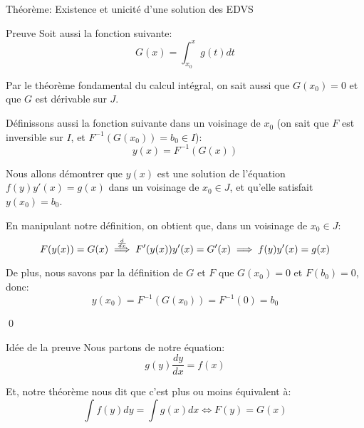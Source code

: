 \documentclass[a4paper]{article}
\begin{document}
\begin{parag}{Théorème: Existence et unicité d'une solution des EDVS}
\begin{subparag}{Preuve}
        Soit aussi la fonction suivante: 
        \[G\left(x\right) = \int_{x_0}^{x} g\left(t\right)dt\]
        
        Par le théorème fondamental du calcul intégral, on sait aussi que $G\left(x_0\right) = 0$ et que $G$ est dérivable sur $J$.

        Définissons aussi la fonction suivante dans un voisinage de $x_0$ (on sait que $F$ est inversible sur $I$, et $F^{-1}\left(G\left(x_0\right)\right) = b_0 \in I$): 
        \[y\left(x\right) = F^{-1}\left(G\left(x\right)\right)\]
        
        Nous allons démontrer que $y\left(x\right)$ est une solution de l'équation $f\left(y\right) y'\left(x\right) = g\left(x\right)$ dans un voisinage de $x_0 \in J$, et qu'elle satisfait $y\left(x_0\right) = b_0$.

        En manipulant notre définition, on obtient que, dans un voisinage de $x_0 \in J$: 
        \[F\left(y\left(x\right)\right) = G\left(x\right) \over{\implies}{$\frac{d}{dx}$}  F'\left(y\left(x\right)\right) y'\left(x\right) = G'\left(x\right) \implies f\left(y\right)y'\left(x\right) =  g\left(x\right)\]

        De plus, nous savons par la définition de $G$ et $F$ que $G\left(x_0\right) = 0$ et $F\left(b_0\right) = 0$, donc:
        \[y\left(x_0\right) = F^{-1}\left(G\left(x_0\right)\right) = F^{-1}\left(0\right) = b_0\]

        \qed
    \end{subparag}

    \begin{subparag}{Idée de la preuve}
        Nous partons de notre équation: 
        \[g\left(y\right) \frac{dy}{dx} = f\left(x\right)\]
        
        Et, notre théorème nous dit que c'est plus ou moins équivalent à: 
        \[\int f\left(y\right)dy = \int g\left(x\right) dx \iff F\left(y\right) = G\left(x\right)\]
    \end{subparag}

\end{parag}
\end{document}
